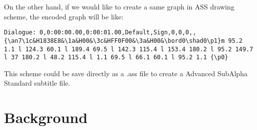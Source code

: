 \documentclass[10pt,twocolumn,letterpaper]{article}
\numberwithin{figure}{section}
\begin{document}
On the other hand, if we would like to create a same graph in ASS drawing scheme, the encoded graph will be like:

\begin{lstlisting}
Dialogue: 0,0:00:00.00,0:00:01.00,Default,Sign,0,0,0,,{\an7\1c&H1838E8&\1a&H00&\3c&HFF0F00&\3a&H00&\bord0\shad0\p1}m 95.2 1.1 l 124.3 60.1 l 189.4 69.5 l 142.3 115.4 l 153.4 180.2 l 95.2 149.7 l 37 180.2 l 48.2 115.4 l 1.1 69.5 l 66.1 60.1 l 95.2 1.1 {\p0}
\end{lstlisting}

This scheme could be save directly as a .ass file to create a Advanced SubAlpha Standard subtitle file.

\section{Background}
\end{document}
